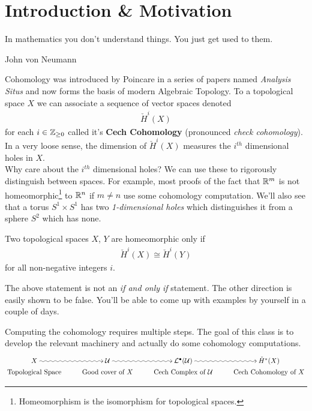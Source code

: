 \maketitle
\tableofcontents
\newpage

\setcounter{section}{-1}
\section{Introduction \& Motivation}
\epigraph{In mathematics you don't understand things. You just get used to them.}{John von Neumann}

Cohomology was introduced by Poincare in a series of papers named \emph{Analysis Situs} and now forms the basis of modern Algebraic Topology.
To a topological space $X$ we can associate a sequence of vector spaces denoted
\begin{align*}
    \check H^i(X)
\end{align*}
for each $i \in \mathbb{Z}_{\ge 0}$ called it's \textbf{Cech Cohomology} (pronounced \emph{check cohomology}). In a very loose sense, the dimension of  $\check H^i(X)$ measures the $i^{th}$ dimensional holes in $X$.\\

Why care about the $i^{th}$ dimensional holes? We can use these to rigorously distinguish between spaces. For example, most proofs of the fact that $\mathbb{R}^m$ is not homeomorphic\footnote{Homeomorphism is the isomorphism for topological spaces.} to $\mathbb{R}^n$ if $m \neq n$ use some cohomology computation. We'll also see that a torus $S^1 \times S^1$ has two \emph{1-dimensional holes} which distinguishes it from a sphere $S^2$ which has none.

\begin{thm}
  Two topological spaces $X$, $Y$ are homeomorphic only if
  \begin{align*}
    \check H^i(X) \cong \check H^i(Y)
  \end{align*} for all non-negative integers $i$.
\end{thm}
\begin{remark}
  The above statement is not an \emph{if and only if} statement. The other direction is easily shown to be false. You'll be able to come up with examples by yourself in a couple of days.
\end{remark}

Computing the cohomology requires multiple steps. The goal of this class is to develop the relevant machinery and actually do some cohomology computations.
\begin{align*}
 \xymatrix@R-2pc{
 X \ar@{~>}[r] & \U \ar@{~>}[r] & \L^\bullet(\U) \ar@{~>}[r] & \check H^*(X)\\
 \mbox{Topological Space} & \mbox{Good cover of } X & \mbox{Cech Complex of } \U & \mbox{Cech Cohomology of } X
 }
\end{align*}

